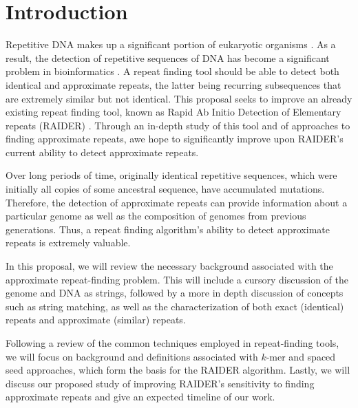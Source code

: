 \chapter{Introduction}
\label{intro}
Repetitive DNA makes up a significant portion of eukaryotic organisms \cite{britten1968repeated}. As a result, the detection of repetitive sequences of DNA has become a significant problem in bioinformatics \cite{pevzner2004de-novo}. A repeat finding tool should be able to detect both identical and approximate repeats, the latter being recurring subsequences that are extremely similar but not identical. This proposal seeks to improve an already existing repeat finding tool, known as Rapid Ab Initio Detection of Elementary repeats (RAIDER) \cite{figueroa2013raider}. Through an in-depth study of this tool and of approaches to finding approximate repeats, awe hope to significantly improve upon RAIDER's current ability to detect approximate repeats.

Over long periods of time, originally identical repetitive sequences, which were initially all copies of some ancestral sequence, have accumulated mutations. Therefore, the detection of approximate repeats can provide information about a particular genome as well as the composition of genomes from previous generations. Thus, a repeat finding algorithm's ability to detect approximate repeats is extremely valuable.

In this proposal, we will review the necessary background associated with the approximate repeat-finding problem. This will include a cursory discussion of the genome and DNA as strings, followed by a more in depth discussion of concepts such as string matching, as well as the characterization of both exact (identical) repeats and approximate (similar) repeats. 

Following a review of the common techniques employed in repeat-finding tools, we will focus on background and definitions associated with $k$-mer and spaced seed approaches, which form the basis for the RAIDER algorithm. Lastly, we will discuss our proposed study of improving RAIDER's sensitivity to finding approximate repeats and give an expected timeline of our work.

\clearpage